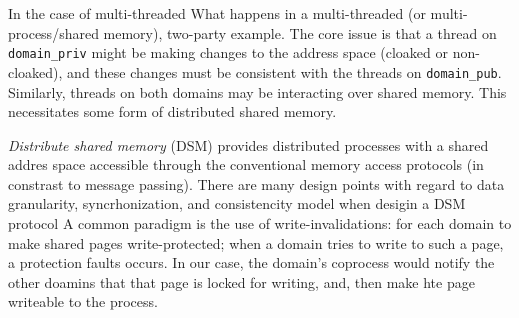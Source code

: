 %
%
%
%
%
%
%


%
In the case of multi-threaded 
What happens in a multi-threaded (or multi-process/shared memory), two-party
example.  
%
The core issue is that a thread on \texttt{domain\_priv} might be making changes to
the address space (cloaked or non-cloaked), and these changes must be
consistent with the threads on \texttt{domain\_pub}.
%
Similarly, threads on both domains may be interacting over shared memory.
%
This necessitates some form of distributed shared memory.


\emph{Distribute shared memory} (DSM) provides distributed processes with a
shared addres space accessible through the conventional memory access protocols
(in constrast to message passing).
%
There are many design points with regard to data granularity, syncrhonization,
and consistencity model when desigin a DSM protocol
%
A common paradigm is the use of  write-invalidations: for each domain to make
shared pages write-protected; when a domain tries to write to such a page, a
protection faults occurs.
%
In our case, the domain's coprocess would notify the other doamins that that
page is locked for writing, and, then make hte page writeable to the process.


